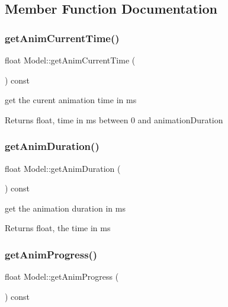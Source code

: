 \subsection{Member Function Documentation}
\mbox{\label{class_model_ae580b0f51abec662e2617d25760e7d75}} 
\subsubsection{\texorpdfstring{get\+Anim\+Current\+Time()}{getAnimCurrentTime()}}
{\footnotesize\ttfamily float Model\+::get\+Anim\+Current\+Time (\begin{DoxyParamCaption}{ }\end{DoxyParamCaption}) const}



get the curent animation time in ms 

\begin{DoxyReturn}{Returns}
float, time in ms between 0 and animation\+Duration 
\end{DoxyReturn}
\mbox{\label{class_model_abcb280fcf613565f8381688b73c7645c}} 
\subsubsection{\texorpdfstring{get\+Anim\+Duration()}{getAnimDuration()}}
{\footnotesize\ttfamily float Model\+::get\+Anim\+Duration (\begin{DoxyParamCaption}{ }\end{DoxyParamCaption}) const}



get the animation duration in ms 

\begin{DoxyReturn}{Returns}
float, the time in ms 
\end{DoxyReturn}
\mbox{\label{class_model_a3bebb9e7811f62ab1b85a5bf02a8a102}} 
\subsubsection{\texorpdfstring{get\+Anim\+Progress()}{getAnimProgress()}}
{\footnotesize\ttfamily float Model\+::get\+Anim\+Progress (\begin{DoxyParamCaption}{ }\end{DoxyParamCaption}) const}



